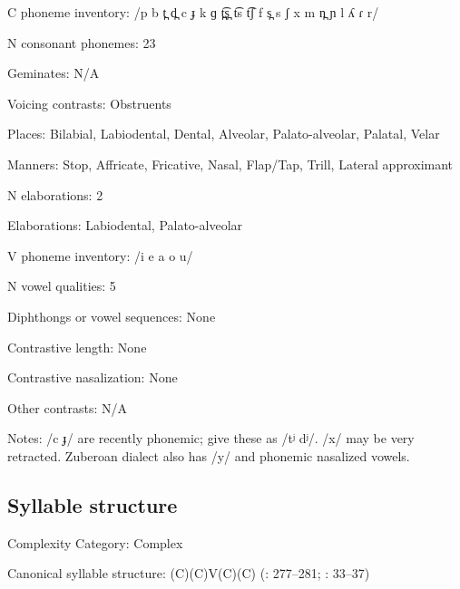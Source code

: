 {\begin{appendixdesc}
\item[C phoneme inventory:] /p b t̪ d̪ c ɟ k ɡ t̪͡s̪ t͡s t͡ʃ f s̪ s ʃ x m n̪ ɲ l ʎ ɾ r/

\item[N consonant phonemes:] 23

\item[Geminates:] N/A

\item[Voicing contrasts:] Obstruents

\item[Places:] Bilabial, Labiodental, Dental, Alveolar, Palato-alveolar, Palatal, Velar

\item[Manners:] Stop, Affricate, Fricative, Nasal, Flap/Tap, Trill, Lateral approximant

\item[N elaborations:] 2

\item[Elaborations:] Labiodental, Palato-alveolar

\item[V phoneme inventory:] /i e a o u/

\item[N vowel qualities:] 5

\item[Diphthongs or vowel sequences:] None

\item[Contrastive length:] None

\item[Contrastive nasalization:] None

\item[Other contrasts:] N/A

\item[Notes:] /c ɟ/ are recently phonemic; \citet{SaltarelliEtAl1988} give these as /tʲ dʲ/. /x/ may be very retracted. Zuberoan dialect also has /y/ and phonemic nasalized vowels.
\end{appendixdesc}
\subsection*{Syllable structure}
\begin{appendixdesc}

\item[Complexity Category:] Complex

\item[Canonical syllable structure:] (C)(C)V(C)(C) (\citealt{SaltarelliEtAl1988}: 277--281; \citealt{Hualde2003}: 33--37)


\end{appendixdesc}}
